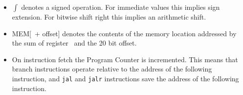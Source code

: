 \documentclass[a4paper,10pt]{article}
\begin{document}
\small{
\begin{itemize}
\item $\int$ denotes a signed operation. For immediate values this implies sign extension. For bitwise shift right this implies an arithmetic shift.

\item MEM[\regssm\ + offset] denotes the contents of the memory location addressed by the sum of register \regssm\ and the 20 bit offset.

\item On instruction fetch the Program Counter is incremented. This means that branch instructions operate relative to
the address of the following instruction, and \texttt{jal} and \texttt{jalr} instructions save the address of the following instruction.
\end{itemize}
}
\end{document}
